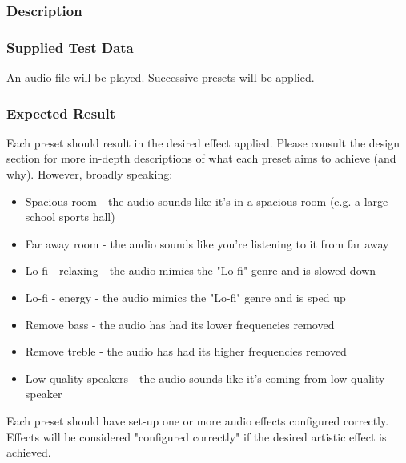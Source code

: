 \subsubsection*{Description}
\paragraph{}
{
	\centering
}

\subsubsection*{Supplied Test Data}
An audio file will be played. Successive presets will be applied.

\subsubsection*{Expected Result}
Each preset should result in the desired effect applied. Please consult the design section for more in-depth descriptions of what each preset aims to achieve (and why). However, broadly speaking:
\begin{itemize}
	\item Spacious room - the audio sounds like it's in a spacious room (e.g. a large school sports hall)
	\item Far away room - the audio sounds like you're listening to it from far away
	\item Lo-fi - relaxing - the audio mimics the "Lo-fi" genre and is slowed down
	\item Lo-fi - energy - the audio mimics the "Lo-fi" genre and is sped up
	\item Remove bass - the audio has had its lower frequencies removed
	\item Remove treble - the audio has had its higher frequencies removed
	\item Low quality speakers - the audio sounds like it's coming from low-quality speaker
\end{itemize}
Each preset should have set-up one or more audio effects configured correctly. Effects will be considered "configured correctly" if the desired artistic effect is achieved.

